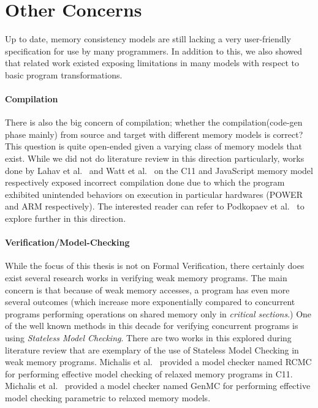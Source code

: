 \section{Other Concerns}

    Up to date, memory consistency models are still lacking a very user-friendly specification for use by many programmers. 
    In addition to this, we also showed that related work existed exposing limitations in many models with respect to basic program transformations.
    
    \paragraph{Compilation}
    There is also the big concern of compilation; whether the compilation(code-gen phase mainly) from source and target with different memory models is correct? This question is quite open-ended given a varying class of memory models that exist. 
    While we did not do literature review in this direction particularly, works done by Lahav et al.~\cite{Lahav} and Watt et al.~\cite{WattC} on the C11 and JavaScript memory model respectively exposed incorrect compilation done due to which the program exhibited unintended behaviors on execution in particular hardwares (POWER and ARM respectively). 
    The interested reader can refer to Podkopaev et al.~\cite{Anton} to explore further in this direction.
    
    \paragraph{Verification/Model-Checking}
    While the focus of this thesis is not on Formal Verification, there certainly does exist several research works in verifying weak memory programs. The main concern is that because of weak memory accesses, a program has even more several outcomes (which increase more exponentially compared to concurrent programs performing operations on shared memory only in \textit{critical sections}.) 
    One of the well known methods in this decade for verifying concurrent programs is using \textit{Stateless Model Checking}. 
    There are two works in this explored during literature review that are exemplary of the use of Stateless Model Checking in weak memory programs.
    Michalis et al.~\cite{Michalis1} provided a model checker named RCMC for performing effective model checking of relaxed memory programs in C11. 
    Michalis et al.~\cite{Michalis2} provided a model checker named GenMC for performing effective model checking parametric to relaxed memory models. 
    
